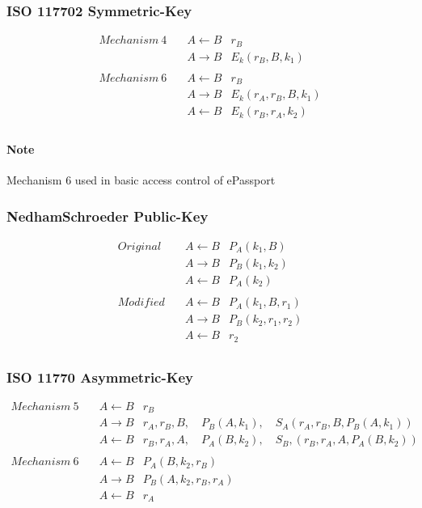 \subsubsection{ISO 11770\text{-}2 Symmetric-Key}
\begin{eqnarray*}
    Mechanism~4 \quad &  A \leftarrow B & r_B \\
                      & A \rightarrow B & E_k(r_B,B,k_1) \\
    \\
    Mechanism~6 \quad & A \leftarrow B & r_B \\
                      & A \rightarrow B & E_k(r_A,r_B,B,k_1) \\
                      & A \leftarrow B & E_k(r_B,r_A,k_2) \\
\end{eqnarray*}

\paragraph{Note}
Mechanism 6 used in basic access control of ePassport

\subsubsection{Nedham\text{-}Schroeder Public-Key}
\begin{eqnarray*}
    Original \quad &  A \leftarrow B & P_A(k_1,B)  \\
                   & A \rightarrow B &  P_B(k_1,k_2) \\
                   & A \leftarrow B & P_A(k_2) \\
    \\
    Modified \quad &  A \leftarrow B & P_A(k_1, B, r_1)  \\
                   & A \rightarrow B & P_B(k_2,r_1,r_2) \\
                   & A \leftarrow B & r_2 \\
\end{eqnarray*}

\subsubsection{ISO 11770\text{-} Asymmetric-Key}
\begin{eqnarray*}
    Mechanism~5 \quad &  A \leftarrow B & r_B \\
                      & A \rightarrow B & r_A,r_B,B, \quad P_B(A,k_1),
    \quad S_A(r_A,r_B,B,P_B(A,k_1))\\
    & A \leftarrow B &
    r_B,r_A,A, \quad P_A(B,k_2), \quad S_B,(r_B,r_A,A,P_A(B,k_2))\\
    \\
    Mechanism~6 \quad &  A \leftarrow B & P_A(B,k_2,r_B) \\
                      & A \rightarrow B & P_B(A,k_2,r_B,r_A) \\
                      & A \leftarrow B & r_A 
\end{eqnarray*}

